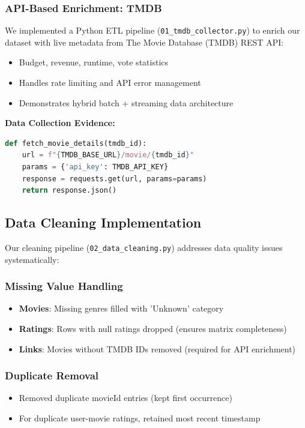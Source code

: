 \documentclass[11pt,a4paper]{article}
\begin{document}
\subsubsection{API-Based Enrichment: TMDB}
We implemented a Python ETL pipeline (\texttt{01\_tmdb\_collector.py}) to enrich our dataset with live metadata from The Movie Database (TMDB) REST API:
\begin{itemize}
    \item Budget, revenue, runtime, vote statistics
    \item Handles rate limiting and API error management
    \item Demonstrates hybrid batch + streaming data architecture
\end{itemize}

\textbf{Data Collection Evidence:}
\begin{lstlisting}[language=Python, caption=TMDB Collection Snippet]
def fetch_movie_details(tmdb_id):
    url = f"{TMDB_BASE_URL}/movie/{tmdb_id}"
    params = {'api_key': TMDB_API_KEY}
    response = requests.get(url, params=params)
    return response.json()
\end{lstlisting}

\subsection{Data Cleaning Implementation}

Our cleaning pipeline (\texttt{02\_data\_cleaning.py}) addresses data quality issues systematically:

\subsubsection{Missing Value Handling}
\begin{itemize}
    \item \textbf{Movies}: Missing genres filled with 'Unknown' category
    \item \textbf{Ratings}: Rows with null ratings dropped (ensures matrix completeness)
    \item \textbf{Links}: Movies without TMDB IDs removed (required for API enrichment)
\end{itemize}

\subsubsection{Duplicate Removal}
\begin{itemize}
    \item Removed duplicate movieId entries (kept first occurrence)
    \item For duplicate user-movie ratings, retained most recent timestamp
\end{itemize}
\end{document}
